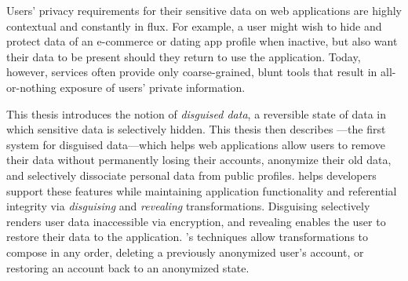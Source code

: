 Users' privacy requirements for their sensitive data on web applications are
highly contextual and constantly in flux. For example, a user might wish to hide
and protect data of an e-commerce or dating app profile when inactive, but also
want their data to be present should they return to use the application. 
%
Today, however, services often provide only coarse-grained, blunt tools that
result in all-or-nothing exposure of users’ private information.
%

%
This thesis introduces the notion of \emph{disguised data}, a reversible state
of data in which sensitive data is selectively hidden.
%
This thesis then describes \sys---the first system for disguised data---which
helps web applications allow users to remove their data without permanently
losing their accounts, anonymize their old data, and selectively dissociate
personal data from public profiles.
%
\sys helps developers support these features while maintaining application
functionality and referential integrity via \emph{disguising} and \emph{revealing}
transformations.
%
Disguising selectively renders user data inaccessible via encryption, and
revealing enables the user to restore their data to the application.
%
\sys's techniques allow transformations to compose in any order, \eg deleting a
previously anonymized user's account, or restoring an account back to an
anonymized state.
%